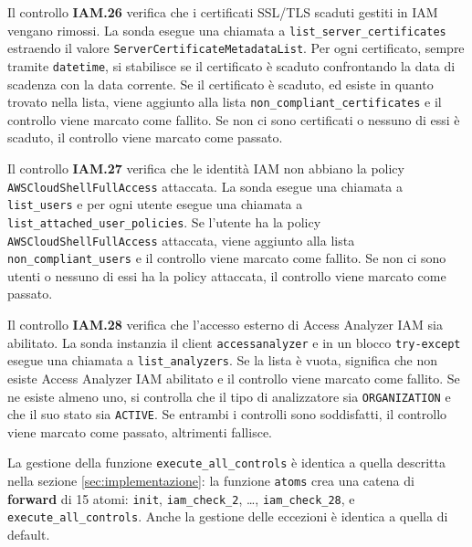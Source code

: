 Il controllo \textbf{IAM.26} verifica che i certificati SSL/TLS scaduti gestiti in IAM vengano rimossi. La sonda esegue una chiamata a \texttt{list\_server\_certificates} estraendo il valore \texttt{ServerCertificateMetadataList}. Per ogni certificato, sempre tramite \texttt{datetime}, si stabilisce se il certificato è scaduto confrontando la data di scadenza con la data corrente. Se il certificato è scaduto, ed esiste in quanto trovato nella lista, viene aggiunto alla lista \texttt{non\_compliant\_certificates} e il controllo viene marcato come fallito. Se non ci sono certificati o nessuno di essi è scaduto, il controllo viene marcato come passato.

Il controllo \textbf{IAM.27} verifica che le identità IAM non abbiano la policy \texttt{AWSCloudShellFullAccess} attaccata. La sonda esegue una chiamata a \texttt{list\_users} e per ogni utente esegue una chiamata a \texttt{list\_attached\_user\_policies}. Se l'utente ha la policy \texttt{AWSCloudShellFullAccess} attaccata, viene aggiunto alla lista \texttt{non\_compliant\_users} e il controllo viene marcato come fallito. Se non ci sono utenti o nessuno di essi ha la policy attaccata, il controllo viene marcato come passato.

Il controllo \textbf{IAM.28} verifica che l'accesso esterno di Access Analyzer IAM sia abilitato. La sonda instanzia il client \texttt{accessanalyzer} e in un blocco \texttt{try-except} esegue una chiamata a \texttt{list\_analyzers}. Se la lista è vuota, significa che non esiste Access Analyzer IAM abilitato e il controllo viene marcato come fallito. Se ne esiste almeno uno, si controlla che il tipo di analizzatore sia \texttt{ORGANIZATION} e che il suo stato sia \texttt{ACTIVE}. Se entrambi i controlli sono soddisfatti, il controllo viene marcato come passato, altrimenti fallisce.

La gestione della funzione \texttt{execute\_all\_controls} è identica a quella descritta nella sezione \ref{sec:implementazione}: la funzione \texttt{atoms} crea una catena di \textbf{forward} di 15 atomi: \texttt{init}, \texttt{iam\_check\_2}, \dots, \texttt{iam\_check\_28}, e \texttt{execute\_all\_controls}. Anche la gestione delle eccezioni è identica a quella di default.

\vspace{1em}

